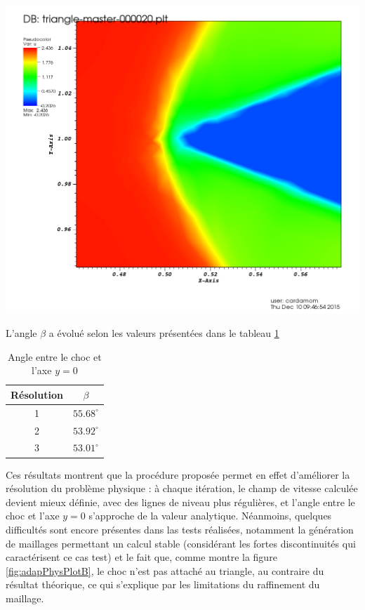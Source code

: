 	\begin{minipage}[t]{1.\linewidth}
		\centering
		\includegraphics[scale=.2]{Bordeaux/figures/AdapPhysique/Plot4bI2B.png}
	\end{minipage}
\endgroup

\indent L'angle \(\beta\) a évolué selon les valeurs présentées dans le tableau \ref{tab:beta}

\begin{table}[!ht]
	\centering
	\begin{tabular}{c|c}
		Résolution & \(\beta\) \\
		\hline
		1 & \(55.68^\circ\) \\
		2 & \(53.92^\circ\) \\
		3 & \(53.01^\circ\) \\
	\end{tabular}
	\caption{Angle entre le choc et l'axe \(y=0\) \label{tab:beta}}
\end{table}

\indent Ces résultats montrent que la procédure proposée permet en effet d'améliorer la résolution du problème physique : à chaque itération, le champ de vitesse calculée devient mieux définie, avec des lignes de niveau plus régulières, et l'angle entre le choc et l'axe \(y=0\) s'approche de la valeur analytique. Néanmoins, quelques difficultés sont encore présentes dans las tests réalisées, notamment la génération de maillages permettant un calcul stable (considérant les fortes discontinuités qui caractérisent ce cas test) et le fait que, comme montre la figure \ref{fig:adapPhysPlotB}, le choc n'est pas attaché au triangle, au contraire du résultat théorique, ce qui s'explique par les limitations du raffinement du maillage.